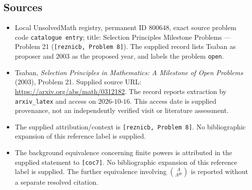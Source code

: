 \documentclass[11pt]{article}
\begin{document}
\subsection{Sources}
\begin{itemize}
\item Local UnsolvedMath registry, permanent ID \(800648\), exact source problem code \texttt{catalogue entry}; title: Selection Principles Milestone Problems --- Problem 21 (\texttt{[reznicb, Problem 8]}). The supplied record lists Tsaban as proposer and \(2003\) as the proposed year, and labels the problem \texttt{open}.
\item Tsaban, \emph{Selection Principles in Mathematics: A Milestone of Open Problems} (2003), Problem 21. Supplied source URL: \url{https://arxiv.org/abs/math/0312182}. The record reports extraction by \texttt{arxiv\_latex} and access on \(2026\text{-}10\text{-}16\). This access date is supplied provenance, not an independently verified visit or literature assessment.
\item The supplied attribution/context is \texttt{[reznicb, Problem 8]}. No bibliographic expansion of this reference label is supplied.
\item The background equivalence concerning finite powers is attributed in the supplied statement to \texttt{[coc7]}. No bibliographic expansion of this reference label is supplied. The further equivalence involving \(\binom{\Lambda}{\Lambda^{gp}}\) is reported without a separate resolved citation.
\end{itemize}
\end{document}

